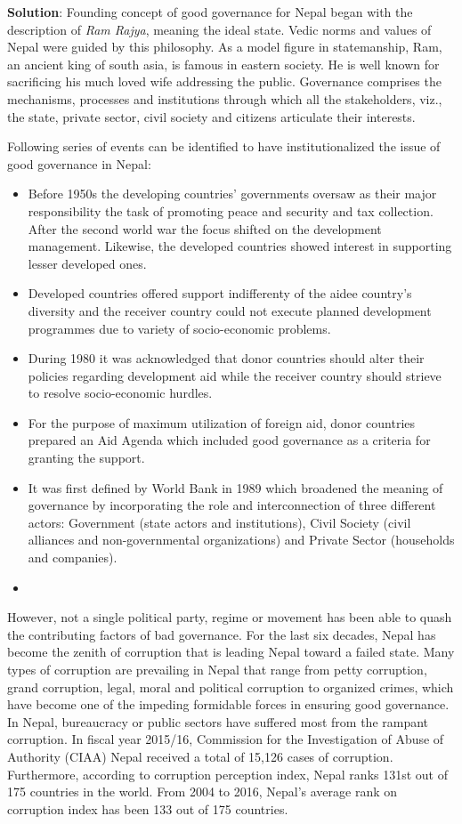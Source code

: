 \documentclass[
  openany]{book}
\newenvironment{solution}{ {\bfseries Solution}:}{}
\begin{document}
\begin{questions}
\begin{solution}
Founding concept of good governance for Nepal began with the description of \textit{Ram Rajya}, meaning the ideal state. Vedic norms and values of Nepal were guided by this philosophy. As a model figure in statemanship, Ram, an ancient king of south asia, is famous in eastern society. He is well known for sacrificing his much loved wife addressing the public. Governance comprises the mechanisms, processes and institutions through which all the stakeholders, viz., the state, private sector, civil society and citizens articulate their interests.

Following series of events can be identified to have institutionalized the issue of good governance in Nepal:

\begin{itemize}
\item Before 1950s the developing countries' governments oversaw as their major responsibility the task of promoting peace and security and tax collection. After the second world war the focus shifted on the development management. Likewise, the developed countries showed interest in supporting lesser developed ones.
\item Developed countries offered support indifferenty of the aidee country's diversity and the receiver country could not execute planned development programmes due to variety of socio-economic problems.
\item During 1980 it was acknowledged that donor countries should alter their policies regarding development aid while the receiver country should strieve to resolve socio-economic hurdles.
\item For the purpose of maximum utilization of foreign aid, donor countries prepared an Aid Agenda which included good governance as a criteria for granting the support.
\item It was first defined by World Bank in 1989 which broadened the meaning of governance by incorporating the role and interconnection of three different actors: Government (state actors and institutions), Civil Society (civil alliances and non-governmental organizations) and Private Sector (households and companies).
\item 
\end{itemize}

However, not a single political party, regime or movement has been able to quash the contributing factors of bad governance. For the last six decades, Nepal has become the zenith of corruption that is leading Nepal toward a failed state. Many types of corruption are prevailing in Nepal that range from petty corruption, grand corruption, legal, moral and political corruption to organized crimes, which have become one of the impeding formidable forces in ensuring good governance. In Nepal, bureaucracy or public sectors have suffered most from the rampant corruption. In fiscal year 2015/16, Commission for the Investigation of Abuse of Authority (CIAA) Nepal received a total of 15,126 cases of corruption.  Furthermore, according to corruption perception index, Nepal ranks 131st out of 175 countries in the world. From 2004 to 2016, Nepal’s average rank on corruption index has been 133 out of 175 countries.


\end{solution}
\end{questions}
\end{document}
